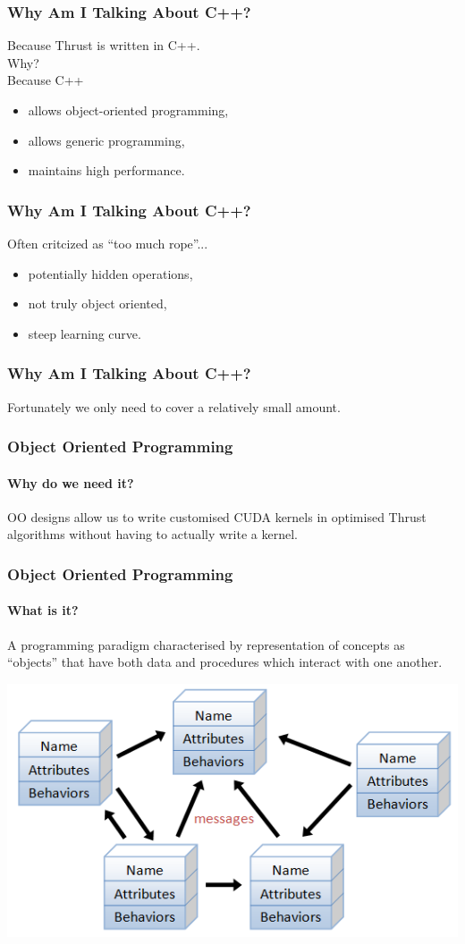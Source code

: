 \documentclass{beamer}
\begin{document}
\begin{frame}
  \frametitle{Why Am I Talking About C++?}
  Because Thrust is written in C++. \\
  \vspace{.2cm}
  \hspace{.5cm}Why? \\
  \vspace{.2cm}
  \hspace{1cm}Because C++
  \vspace{.1cm}
  \begin{itemize}
    \item allows object-oriented programming,
    \item allows generic programming,
    \item maintains high performance.
  \end{itemize}
\end{frame}

\begin{frame}
  \frametitle{Why Am I Talking About C++?}
  Often critcized as ``too much rope''...
  \begin{itemize}
    \item potentially hidden operations,
    \item not truly object oriented,
    \item steep learning curve.
  \end{itemize}
\end{frame}

\begin{frame}
  \frametitle{Why Am I Talking About C++?}
  Fortunately we only need to cover a relatively small
  amount.
\end{frame}

\begin{frame}
  \frametitle{Object Oriented Programming}
  \framesubtitle{Why do we need it?}
  OO designs allow us to write customised CUDA kernels
  in optimised Thrust algorithms without having to
  actually write a kernel.
\end{frame}

\begin{frame}
  \frametitle{Object Oriented Programming}
  \framesubtitle{What is it?}
  A programming paradigm characterised by representation of concepts
  as ``objects'' that have both data and procedures which interact
  with one another.
  \begin{center}
    \includegraphics[width=.7\textwidth]{oop_objects.png}
  \end{center}
\end{frame}
\end{document}
